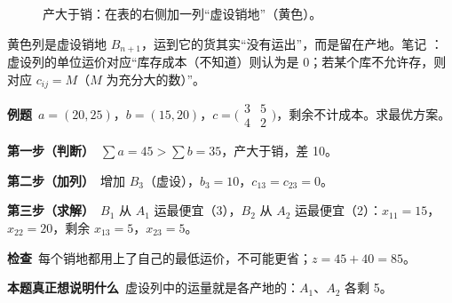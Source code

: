 \begin{figure}[H]
\centering
{}
\caption{产大于销：在表的右侧加一列“虚设销地”（黄色）。}\label{fig:addcol}
\end{figure}
黄色列是虚设销地 $B_{n+1}$，运到它的货其实“没有运出”，而是留在产地。笔记 \orig：虚设列的单位运价对应“库存成本（不知道）则认为是 0；若某个库不允许存，则对应 $c_{ij}=M$（$M$ 为充分大的数）”。

\begin{examplebox}[产大于销的小例子]
\textbf{例题}\ $a=(20,25)$，$b=(15,20)$，$c=\bigl(\begin{smallmatrix}3&5\\4&2\end{smallmatrix}\bigr)$，剩余不计成本。求最优方案。\par
\begin{minipage}{0.55\linewidth}
\textbf{第一步（判断）}\ $\sum a=45>\sum b=35$，产大于销，差 10。\par
\textbf{第二步（加列）}\ 增加 $B_3$（虚设），$b_3=10$，$c_{13}=c_{23}=0$。\par
\textbf{第三步（求解）}\ $B_1$ 从 $A_1$ 运最便宜（3），$B_2$ 从 $A_2$ 运最便宜（2）：$x_{11}=15$，$x_{22}=20$，剩余 $x_{13}=5$，$x_{23}=5$。\par
\textbf{检查}\ 每个销地都用上了自己的最低运价，不可能更省；$z=45+40=85$。
\end{minipage}\hfill
\begin{minipage}{0.42\linewidth}\centering
{}
\end{minipage}\par
\textbf{本题真正想说明什么}\ 虚设列中的运量就是各产地的：$A_1$、$A_2$ 各剩 5。
\end{examplebox}

